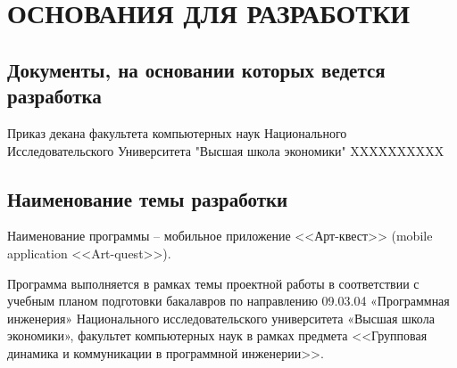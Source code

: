 \pagestyle{fancy}

\section{ОСНОВАНИЯ ДЛЯ РАЗРАБОТКИ}


\subsection{Документы, на основании которых ведется разработка} 
	
\hspace{10mm} Приказ декана факультета компьютерных наук Национального Исследовательского Университета "Высшая школа экономики" XXXXXXXXXX
	
\subsection{Наименование темы разработки}

\hspace{10mm} Наименование программы -- мобильное приложение <<Арт-квест>> (mobile application <<Art-quest>>).

\hspace{10mm} Программа выполняется в рамках темы проектной работы в соответствии с учебным
планом подготовки бакалавров по направлению 09.03.04 «Программная инженерия»
Национального исследовательского университета «Высшая школа экономики», факультет компьютерных наук в рамках предмета <<Групповая динамика и коммуникации в программной инженерии>>.
	

